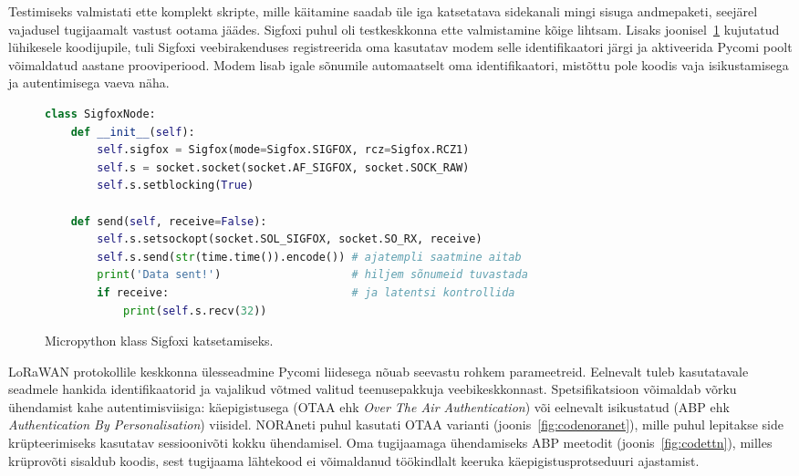 \documentclass[12pt]{article}
\begin{document}
    Testimiseks valmistati ette komplekt skripte, mille käitamine saadab üle iga katsetatava sidekanali mingi sisuga andmepaketi, seejärel vajadusel tugijaamalt vastust ootama jäädes.
    Sigfoxi puhul oli testkeskkonna ette valmistamine kõige lihtsam.
    Lisaks joonisel~\ref{fig:codesigfox} kujutatud lühikesele koodijupile, tuli Sigfoxi veebirakenduses registreerida oma kasutatav modem selle identifikaatori järgi ja aktiveerida Pycomi poolt võimaldatud aastane prooviperiood.
    Modem lisab igale sõnumile automaatselt oma identifikaatori, mistõttu pole koodis vaja isikustamisega ja autentimisega vaeva näha.
    \begin{figure}[h]
    \begin{spacing}{0.8}
    \begin{lstlisting}[language=Python]
class SigfoxNode:
    def __init__(self):
        self.sigfox = Sigfox(mode=Sigfox.SIGFOX, rcz=Sigfox.RCZ1)
        self.s = socket.socket(socket.AF_SIGFOX, socket.SOCK_RAW)
        self.s.setblocking(True)

    def send(self, receive=False):
        self.s.setsockopt(socket.SOL_SIGFOX, socket.SO_RX, receive)
        self.s.send(str(time.time()).encode()) # ajatempli saatmine aitab
        print('Data sent!')                    # hiljem sõnumeid tuvastada
        if receive:                            # ja latentsi kontrollida
            print(self.s.recv(32))
    \end{lstlisting}
    \end{spacing}
    \caption{Micropython klass Sigfoxi katsetamiseks.}
    \label{fig:codesigfox}
    \end{figure}

    LoRaWAN protokollile keskkonna ülesseadmine Pycomi liidesega nõuab seevastu rohkem parameetreid.
    Eelnevalt tuleb kasutatavale seadmele hankida identifikaatorid ja vajalikud võtmed valitud teenusepakkuja veebikeskkonnast.
    Spetsifikatsioon võimaldab võrku ühendamist kahe autentimisviisiga: käepigistusega (OTAA ehk \textit{Over The Air Authentication}) või eelnevalt isikustatud (ABP ehk \textit{Authentication By Personalisation}) viisidel.
    NORAneti puhul kasutati OTAA varianti (joonis~\ref{fig:codenoranet}), mille puhul lepitakse side krüpteerimiseks kasutatav sessioonivõti kokku ühendamisel.
    Oma tugijaamaga ühendamiseks ABP meetodit (joonis~\ref{fig:codettn}), milles krüprovõti sisaldub koodis, sest tugijaama lähtekood ei võimaldanud töökindlalt keeruka käepigistusprotseduuri ajastamist.
\end{document}
